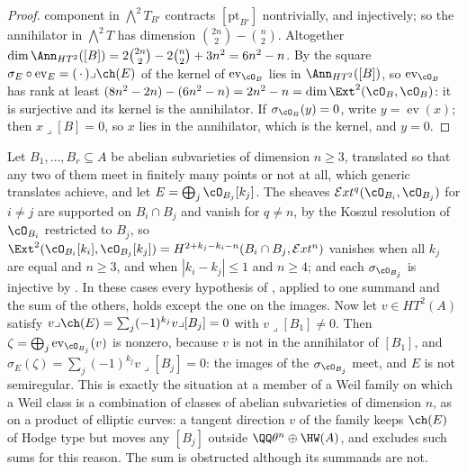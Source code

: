 \begin{proof}
component in ${\textstyle\bigwedge^{2}}T_{B'}$ contracts $[\mathrm{pt}_{B'}]$
nontrivially, and injectively; so the annihilator in
${\textstyle\bigwedge^{2}}T$ has dimension $\binom{2n}{2}-\binom{n}{2}$.
Altogether $\dim\Ann_{HT^{2}}([B])=2\binom{2n}{2}-2\binom{n}{2}+3n^{2}
=6n^{2}-n$. By the square $\sigma_{E}\circ\operatorname{ev}_{E}=
(\,\cdot\,)\lrcorner\ch(E)$ of \cite[Setup~4.54]{paperII} the kernel of
$\operatorname{ev}_{\cO_{B}}$ lies in $\Ann_{HT^{2}}([B])$, so
$\operatorname{ev}_{\cO_{B}}$ has rank at least $(8n^{2}-2n)-(6n^{2}-n)
=2n^{2}-n=\dim\Ext^{2}(\cO_{B},\cO_{B})$: it is surjective and its kernel is
the annihilator. If $\sigma_{\cO_{B}}(y)=0$, write $y=\operatorname{ev}(x)$;
then $x\lrcorner[B]=0$, so $x$ lies in the annihilator, which is the kernel,
and $y=0$.
\end{proof}

\begin{remark}\label{rem:absums}
Let $B_{1},\dots,B_{r}\subseteq A$ be abelian subvarieties of dimension
$n\ge3$, translated so that any two of them meet in finitely many points or
not at all, which generic translates achieve, and let $E=\bigoplus_{j}
\cO_{B_{j}}[k_{j}]$. The sheaves $\mathcal{E}xt^{q}(\cO_{B_{i}},\cO_{B_{j}})$
for $i\ne j$ are supported on $B_{i}\cap B_{j}$ and vanish for $q\ne n$,
by the Koszul resolution of $\cO_{B_{i}}$ restricted to $B_{j}$, so
$\Ext^{2}(\cO_{B_{i}}[k_{i}],\cO_{B_{j}}[k_{j}])=H^{2+k_{j}-k_{i}-n}
(B_{i}\cap B_{j},\mathcal{E}xt^{n})$ vanishes when all $k_{j}$ are equal and
$n\ge3$, and when $|k_{i}-k_{j}|\le1$ and $n\ge4$; and each
$\sigma_{\cO_{B_{j}}}$ is injective by . In these cases
every hypothesis of , applied to one summand and the
sum of the others, holds except the one on the images. Now let $v\in HT^{2}(A)$
satisfy $v\lrcorner\ch(E)=\sum_{j}(-1)^{k_{j}}v\lrcorner[B_{j}]=0$ with
$v\lrcorner[B_{1}]\ne0$. Then $\zeta=\bigoplus_{j}\operatorname{ev}_{\cO_{B_{j}}}(v)$
is nonzero, because $v$ is not in the annihilator of $[B_{1}]$, and
$\sigma_{E}(\zeta)=\sum_{j}(-1)^{k_{j}}v\lrcorner[B_{j}]=0$: the images of
the $\sigma_{\cO_{B_{j}}}$ meet, and $E$ is not semiregular. This is exactly
the situation at a member of a Weil family on which a Weil class is a
combination of classes of abelian subvarieties of dimension $n$, as on a
product of elliptic curves: a tangent direction $v$ of the family keeps
$\ch(E)$ of Hodge type but moves any $[B_{j}]$ outside
$\QQ\theta^{n}\oplus\HW(A)$, and \cite[Corollary~3.17]{paperII} excludes such sums
for this reason. The sum is obstructed although its summands are not.
\end{remark}


